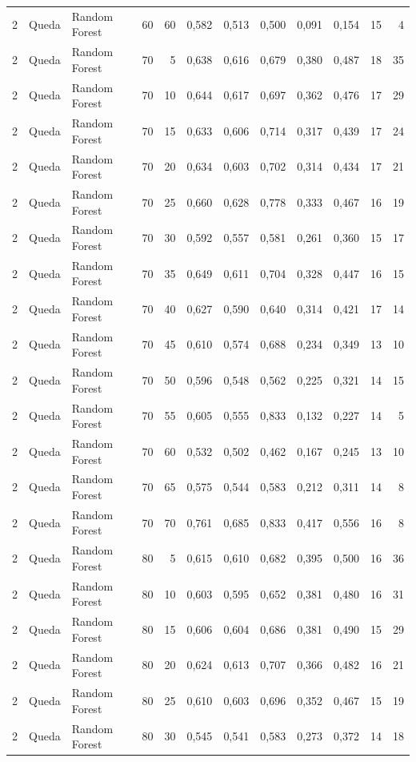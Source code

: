 \begin{longtable}{@{}rllrrrrrrrrr@{}}
2 & Queda & Random Forest & 60 & 60 & 0,582 & 0,513 & 0,500 & 0,091 & 0,154 & 15 & 4 \\
2 & Queda & Random Forest & 70 & 5 & 0,638 & 0,616 & 0,679 & 0,380 & 0,487 & 18 & 35 \\
2 & Queda & Random Forest & 70 & 10 & 0,644 & 0,617 & 0,697 & 0,362 & 0,476 & 17 & 29 \\
2 & Queda & Random Forest & 70 & 15 & 0,633 & 0,606 & 0,714 & 0,317 & 0,439 & 17 & 24 \\
2 & Queda & Random Forest & 70 & 20 & 0,634 & 0,603 & 0,702 & 0,314 & 0,434 & 17 & 21 \\
2 & Queda & Random Forest & 70 & 25 & 0,660 & 0,628 & 0,778 & 0,333 & 0,467 & 16 & 19 \\
2 & Queda & Random Forest & 70 & 30 & 0,592 & 0,557 & 0,581 & 0,261 & 0,360 & 15 & 17 \\
2 & Queda & Random Forest & 70 & 35 & 0,649 & 0,611 & 0,704 & 0,328 & 0,447 & 16 & 15 \\
2 & Queda & Random Forest & 70 & 40 & 0,627 & 0,590 & 0,640 & 0,314 & 0,421 & 17 & 14 \\
2 & Queda & Random Forest & 70 & 45 & 0,610 & 0,574 & 0,688 & 0,234 & 0,349 & 13 & 10 \\
2 & Queda & Random Forest & 70 & 50 & 0,596 & 0,548 & 0,562 & 0,225 & 0,321 & 14 & 15 \\
2 & Queda & Random Forest & 70 & 55 & 0,605 & 0,555 & 0,833 & 0,132 & 0,227 & 14 & 5 \\
2 & Queda & Random Forest & 70 & 60 & 0,532 & 0,502 & 0,462 & 0,167 & 0,245 & 13 & 10 \\
2 & Queda & Random Forest & 70 & 65 & 0,575 & 0,544 & 0,583 & 0,212 & 0,311 & 14 & 8 \\
2 & Queda & Random Forest & 70 & 70 & 0,761 & 0,685 & 0,833 & 0,417 & 0,556 & 16 & 8 \\
2 & Queda & Random Forest & 80 & 5 & 0,615 & 0,610 & 0,682 & 0,395 & 0,500 & 16 & 36 \\
2 & Queda & Random Forest & 80 & 10 & 0,603 & 0,595 & 0,652 & 0,381 & 0,480 & 16 & 31 \\
2 & Queda & Random Forest & 80 & 15 & 0,606 & 0,604 & 0,686 & 0,381 & 0,490 & 15 & 29 \\
2 & Queda & Random Forest & 80 & 20 & 0,624 & 0,613 & 0,707 & 0,366 & 0,482 & 16 & 21 \\
2 & Queda & Random Forest & 80 & 25 & 0,610 & 0,603 & 0,696 & 0,352 & 0,467 & 15 & 19 \\
2 & Queda & Random Forest & 80 & 30 & 0,545 & 0,541 & 0,583 & 0,273 & 0,372 & 14 & 18 \\

\end{longtable}
